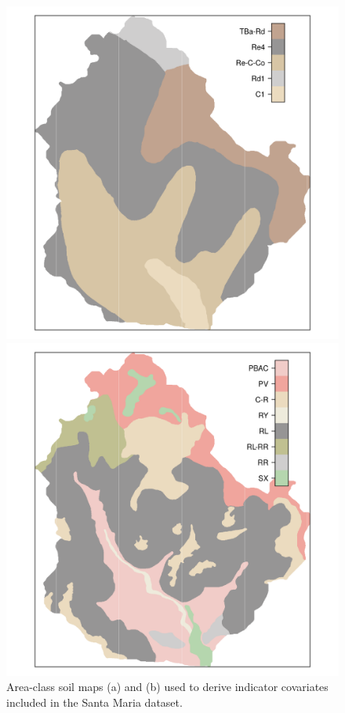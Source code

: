 \begin{figure}[!ht]
\centering
\begin{minipage}[b]{63mm}
\subcaption{}
\centering
\includegraphics{fig/chap05-soil-old}
\end{minipage}
\begin{minipage}[b]{63mm}
\subcaption{}
\centering
\includegraphics{fig/chap05-soil-new}
\end{minipage} 
\caption[Area-class soil maps included in the Santa Maria dataset.]{Area-class soil maps (a) \soilOld{} and 
(b) 
\soilNew{} used to derive indicator covariates included in the Santa Maria dataset.}
\label{fig:chap05-soil-maps}
\end{figure}

